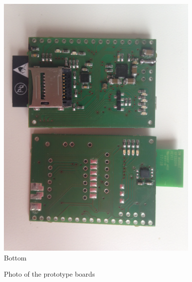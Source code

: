 \documentclass[12pt,a4paper]{article}
\begin{document}
\begin{figure}[h!]
\begin{minipage}{10cm}
    \includegraphics[width=10cm]{img/2.jpg}
    \\\centering Bottom
  \end{minipage}
  \caption{Photo of the prototype boards}
  \label{BoardPhotos}
\end{figure}

\newpage
\tableofcontents

\newpage
\end{document}
